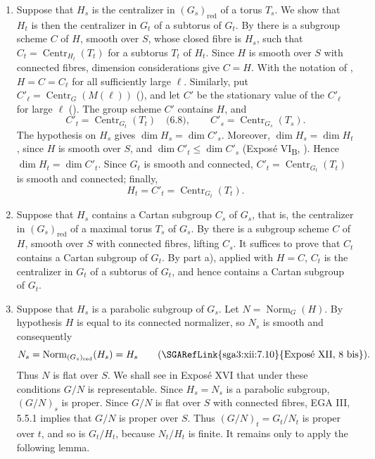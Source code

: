 \begin{enumerate}
\renewcommand{\labelenumi}{\alph{enumi})}
\item Suppose that \(H_s\) is the centralizer in \((G_s)_{\mathrm{red}}\) of a torus
\(T_s\). We show that \(H_t\) is then the centralizer in \(G_t\) of a subtorus of
\(G_t\). By  there is a subgroup scheme \(C\) of \(H\), smooth over \(S\),
whose closed fibre is \(H_s\), such that
\(C_t=\operatorname{Centr}_{H_t}(T_t)\) for a subtorus \(T_t\) of \(H_t\). Since
\(H\) is smooth over \(S\) with connected fibres, dimension considerations give
\(C=H\). With the notation of , \(H=C=C_\ell\) for all sufficiently large
\(\ell\). Similarly, put
\(C'_\ell=\operatorname{Centr}_G(M(\ell))\) (), and let \(C'\) be the stationary
value of the \(C'_\ell\) for large \(\ell\) (). The group scheme \(C'\)
contains \(H\), and
\[
C'_t=\operatorname{Centr}_{G_t}(T_t)\quad\text{(6.8)},\qquad
C'_s=\operatorname{Centr}_{G_s}(T_s).
\]
The hypothesis on \(H_s\) gives \(\dim H_s=\dim C'_s\). Moreover,
\(\dim H_s=\dim H_t\), since \(H\) is smooth over \(S\), and
\(\dim C'_t\leq \dim C'_s\) (Exposé VI\textsubscript{B}, ). Hence
\(\dim H_t=\dim C'_t\). Since \(G_t\) is smooth and connected,
\(C'_t=\operatorname{Centr}_{G_t}(T_t)\) is smooth and connected; finally,
\[
H_t=C'_t=\operatorname{Centr}_{G_t}(T_t).
\]

\item Suppose that \(H_s\) contains a Cartan subgroup \(C_s\) of \(G_s\), that is,
the centralizer in \((G_s)_{\mathrm{red}}\) of a maximal torus \(T_s\) of \(G_s\).
By  there is a subgroup scheme \(C\) of \(H\), smooth over \(S\) with connected
fibres, lifting \(C_s\). It suffices to prove that \(C_t\) contains a Cartan subgroup
of \(G_t\). By part a), applied with \(H=C\), \(C_t\) is the centralizer in \(G_t\)
of a subtorus of \(G_t\), and hence contains a Cartan subgroup of \(G_t\).

\item Suppose that \(H_s\) is a parabolic subgroup of \(G_s\). Let
\(N=\operatorname{Norm}_G(H)\). By hypothesis \(H\) is equal to its connected
normalizer, so \(N_s\) is smooth and consequently
\[
N_s=\operatorname{Norm}_{(G_s)_{\mathrm{red}}}(H_s)=H_s
\qquad\text{(\SGARefLink{sga3:xii:7.10}{Exposé XII, 8 bis}).}
\]
Thus \(N\) is flat over \(S\). We shall see in Exposé XVI that under these
conditions \(G/N\) is representable. Since \(H_s=N_s\) is a parabolic subgroup,
\((G/N)_s\) is proper. Since \(G/N\) is flat over \(S\) with connected fibres,
EGA III, 5.5.1 implies that \(G/N\) is proper over \(S\). Thus
\((G/N)_t=G_t/N_t\) is proper over \(t\), and so is \(G_t/H_t\), because
\(N_t/H_t\) is finite. It remains only to apply the following lemma.
\end{enumerate}

